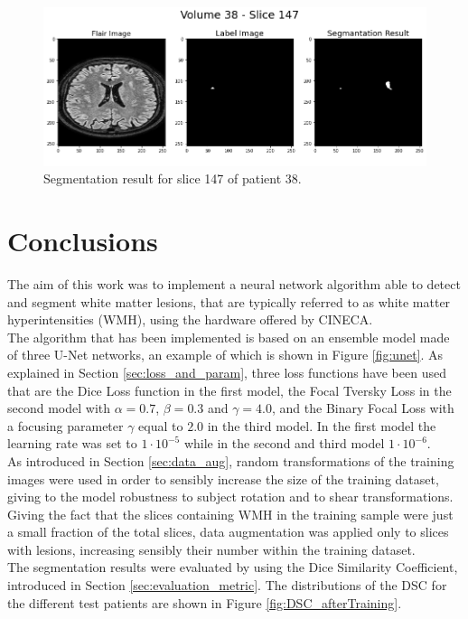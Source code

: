 \documentclass[12pt]{extarticle}
\begin{document}
\begin{figure}[h!]
\centering
\includegraphics[width = \textwidth]{volume-038-147.png}
\caption{Segmentation result for slice 147 of patient 38.}
\label{fig:volume-038-147}
\end{figure}

\section{Conclusions}
The aim of this work was to implement a neural network algorithm able to detect and segment white matter lesions, that are typically referred to as white matter hyperintensities (WMH), using the hardware offered by CINECA.\\
The algorithm that has been implemented is based on an ensemble model made of three U-Net networks, an example of which is shown in Figure \ref{fig:unet}. As explained in Section \ref{sec:loss_and_param}, three loss functions have been used that are the Dice Loss function in the first model, the Focal Tversky Loss in the second model with $\alpha = 0.7$, $\beta = 0.3$ and $\gamma = 4.0$, and the Binary Focal Loss with a focusing parameter $\gamma$ equal to $2.0$ in the third model. In the first model the learning rate was set to $1\cdot 10^{-5}$ while in the second and third model $1\cdot 10^{-6}$.\\[4pt]
As introduced in Section \ref{sec:data_aug}, random transformations of the training images were used in order to sensibly increase the size of the training dataset, giving to the model robustness to subject rotation and to shear transformations. \\
Giving the fact that the slices containing WMH in the training sample were just a small fraction of the total slices, data augmentation was applied only to slices with lesions, increasing sensibly their number within the training dataset.\\[4pt]
The segmentation results were evaluated by using the Dice Similarity Coefficient, introduced in Section \ref{sec:evaluation_metric}. The distributions of the DSC for the different test patients are shown in Figure \ref{fig:DSC_afterTraining}. 
\end{document}
